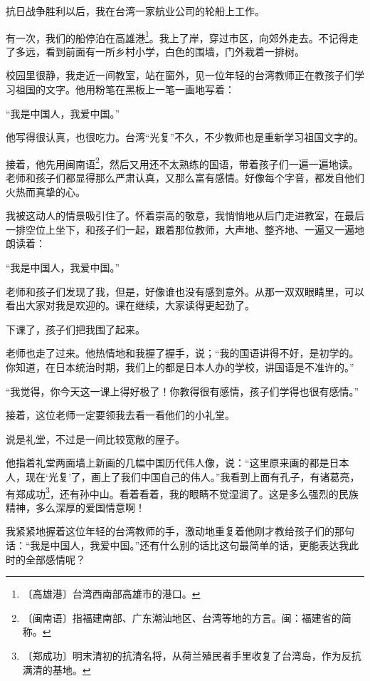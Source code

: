 \documentclass[12pt,UTF-8,openany]{ctexbook}
\begin{document}
\begin{Large}
    
    抗日战争胜利以后，我在台湾一家航业公司的轮船上工作。
    
    有一次，我们的船停泊在高雄港\footnote{〔高雄港〕台湾西南部高雄市的港口。}。我上了岸，穿过市区，向郊外走去。不记得走了多远，看到前面有一所乡村小学，白色的围墙，门外栽着一排树。
    
    校园里很静，我走近一间教室，站在窗外，见一位年轻的台湾教师正在教孩子们学习祖国的文字。他用粉笔在黑板上一笔一画地写着：
    
    “我是中国人，我爱中国。”
    
    他写得很认真，也很吃力。台湾“光复”不久，不少教师也是重新学习祖国文字的。
    
    接着，他先用闽南语\footnote{〔闽南语〕指福建南部、广东潮汕地区、台湾等地的方言。闽：福建省的简称。}，然后又用还不太熟练的国语，带着孩子们一遍一遍地读。老师和孩子们都显得那么严肃认真，又那么富有感情。好像每个字音，都发自他们火热而真挚的心。
    
    我被这动人的情景吸引住了。怀着崇高的敬意，我悄悄地从后门走进教室，在最后一排空位上坐下，和孩子们一起，跟着那位教师，大声地、整齐地、一遍又一遍地朗读着：
    
    “我是中国人，我爱中国。”
    
    老师和孩子们发现了我，但是，好像谁也没有感到意外。从那一双双眼睛里，可以看出大家对我是欢迎的。课在继续，大家读得更起劲了。
    
    下课了，孩子们把我围了起来。
    
    老师也走了过来。他热情地和我握了握手，说；“我的国语讲得不好，是初学的。你知道，在日本统治时期，我们上的都是日本人办的学校，讲国语是不准许的。”
    
    “我觉得，你今天这一课上得好极了！你教得很有感情，孩子们学得也很有感情。”
    
    接着，这位老师一定要领我去看一看他们的小礼堂。
    
    说是礼堂，不过是一间比较宽敞的屋子。
    
    他指着礼堂两面墙上新画的几幅中国历代伟人像，说：“这里原来画的都是日本人，现在‘光复’了，画上了我们中国自己的伟人。”我看到上面有孔子，有诸葛亮，有郑成功\footnote{〔郑成功〕明末清初的抗清名将，从荷兰殖民者手里收复了台湾岛，作为反抗满清的基地。}，还有孙中山。看着看着，我的眼睛不觉湿润了。这是多么强烈的民族精神，多么深厚的爱国情意啊！
    
    我紧紧地握着这位年轻的台湾教师的手，激动地重复着他刚才教给孩子们的那句话：“我是中国人，我爱中国。”还有什么别的话比这句最简单的话，更能表达我此时的全部感情呢？
    
\end{Large}
\end{document}
